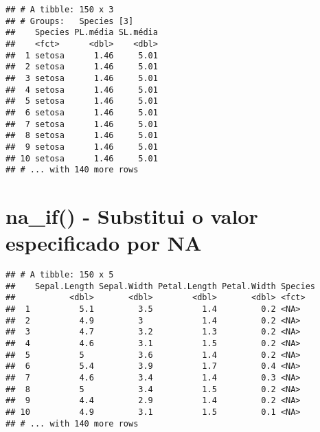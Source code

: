 \documentclass[]{book}
\newenvironment{Shaded}{\begin{snugshade}}{\end{snugshade}}
\newcommand{\DataTypeTok}[1]{\textcolor[rgb]{0.13,0.29,0.53}{#1}}
\newcommand{\KeywordTok}[1]{\textcolor[rgb]{0.13,0.29,0.53}{\textbf{#1}}}
\newcommand{\NormalTok}[1]{#1}
\newcommand{\OperatorTok}[1]{\textcolor[rgb]{0.81,0.36,0.00}{\textbf{#1}}}
\newcommand{\StringTok}[1]{\textcolor[rgb]{0.31,0.60,0.02}{#1}}
\begin{document}
\begin{Shaded}
\end{Shaded}

\begin{verbatim}
## # A tibble: 150 x 3
## # Groups:   Species [3]
##    Species PL.média SL.média
##    <fct>      <dbl>    <dbl>
##  1 setosa      1.46     5.01
##  2 setosa      1.46     5.01
##  3 setosa      1.46     5.01
##  4 setosa      1.46     5.01
##  5 setosa      1.46     5.01
##  6 setosa      1.46     5.01
##  7 setosa      1.46     5.01
##  8 setosa      1.46     5.01
##  9 setosa      1.46     5.01
## 10 setosa      1.46     5.01
## # ... with 140 more rows
\end{verbatim}

\hypertarget{na_if---substitui-o-valor-especificado-por-na}{%
\section{na\_if() - Substitui o valor especificado por NA}\label{na_if---substitui-o-valor-especificado-por-na}}

\begin{Shaded}
\end{Shaded}

\begin{verbatim}
## # A tibble: 150 x 5
##    Sepal.Length Sepal.Width Petal.Length Petal.Width Species
##           <dbl>       <dbl>        <dbl>       <dbl> <fct>  
##  1          5.1         3.5          1.4         0.2 <NA>   
##  2          4.9         3            1.4         0.2 <NA>   
##  3          4.7         3.2          1.3         0.2 <NA>   
##  4          4.6         3.1          1.5         0.2 <NA>   
##  5          5           3.6          1.4         0.2 <NA>   
##  6          5.4         3.9          1.7         0.4 <NA>   
##  7          4.6         3.4          1.4         0.3 <NA>   
##  8          5           3.4          1.5         0.2 <NA>   
##  9          4.4         2.9          1.4         0.2 <NA>   
## 10          4.9         3.1          1.5         0.1 <NA>   
## # ... with 140 more rows
\end{verbatim}
\end{document}
